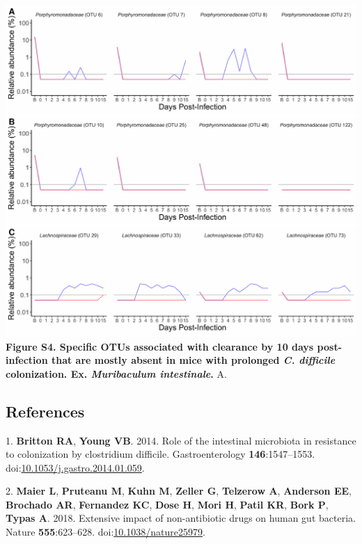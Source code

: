 \documentclass[
  11pt,
]{article}
\begin{document}
\includegraphics{figure_S4.pdf} \textbf{Figure S4. Specific OTUs
associated with clearance by 10 days post-infection that are mostly
absent in mice with prolonged \emph{C. difficile} colonization. Ex.
\emph{Muribaculum intestinale}.} A. \newpage

\hypertarget{references}{%
\subsection*{References}\label{references}}

\hypertarget{refs}{}
\leavevmode\hypertarget{ref-Britton2014}{}%
1. \textbf{Britton RA}, \textbf{Young VB}. 2014. Role of the intestinal
microbiota in resistance to colonization by clostridium difficile.
Gastroenterology \textbf{146}:1547--1553.
doi:\href{https://doi.org/10.1053/j.gastro.2014.01.059}{10.1053/j.gastro.2014.01.059}.

\leavevmode\hypertarget{ref-Maier2018}{}%
2. \textbf{Maier L}, \textbf{Pruteanu M}, \textbf{Kuhn M},
\textbf{Zeller G}, \textbf{Telzerow A}, \textbf{Anderson EE},
\textbf{Brochado AR}, \textbf{Fernandez KC}, \textbf{Dose H},
\textbf{Mori H}, \textbf{Patil KR}, \textbf{Bork P}, \textbf{Typas A}.
2018. Extensive impact of non-antibiotic drugs on human gut bacteria.
Nature \textbf{555}:623--628.
doi:\href{https://doi.org/10.1038/nature25979}{10.1038/nature25979}.
\end{document}
